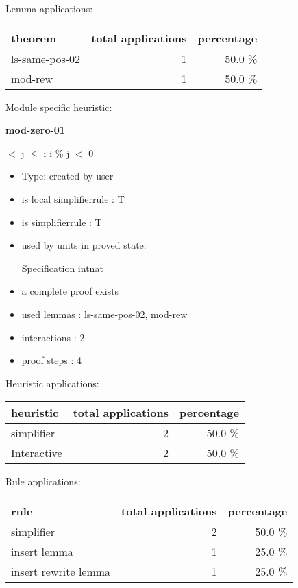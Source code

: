 \documentclass[a4paper]{article}
\begin{document}
Lemma applications:

\begin{supertabular}{l|r|r}
theorem	        & total applications & percentage \\ \hline
ls-same-pos-02 & 1 & 50.0 \% \\
mod-rew & 1 & 50.0 \% \\

\end{supertabular}

Module specific heuristic:

\pagebreak

{\LARGE\bf mod-zero-01}\label{lemma-mod-zero-01}

\medskip

  $<$ j  $\le$ i \Imp \Not i \% j $<$ 0

\begin{itemize}

\item Type: created by user

\item is local simplifierrule : T
\item is simplifierrule : T
\item used by units in proved state:

Specification intnat
\item       a complete proof exists
\item       used lemmas  : ls-same-pos-02, mod-rew
\item       interactions : 2
\item       proof steps  : 4
\end{itemize}

\medskip


Heuristic applications:

\begin{supertabular}{l|r|r}
heuristic	& total applications & percentage \\ \hline
simplifier & 2 & 50.0 \% \\
Interactive & 2 & 50.0 \% \\

\end{supertabular}

Rule applications:

\begin{supertabular}{l|r|r}
rule	        & total applications & percentage \\ \hline
simplifier & 2 & 50.0 \% \\
insert lemma & 1 & 25.0 \% \\
insert rewrite lemma & 1 & 25.0 \% \\

\end{supertabular}
\end{document}
